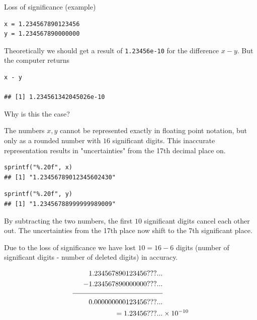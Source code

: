 \documentclass[11pt,compress,t,notes=noshow, xcolor=table]{beamer}
\begin{document}
\begin{vbframe}{Loss of significance (example)}

\footnotesize
\begin{verbatim}
x = 1.234567890123456
y = 1.234567890000000
\end{verbatim}


\normalsize
\lz
Theoretically we should get a result of \texttt{1.23456e-10} for the difference $x - y$. But the computer returns
\lz
\footnotesize
\begin{verbatim}
x - y

## [1] 1.234561342045026e-10
\end{verbatim}

\lz
\lz
\normalsize
Why is this the case?

\framebreak

The numbers $x, y$ cannot be represented exactly in floating point notation, but only as a rounded number with $16$ significant digits. This inaccurate representation results in "uncertainties" from the 17th decimal place on.

\lz
\lz
\footnotesize
\begin{verbatim}
sprintf("%.20f", x)
## [1] "1.23456789012345602430"
\end{verbatim}


\vspace{0.1cm}
\begin{verbatim}
sprintf("%.20f", y)
## [1] "1.23456788999999989009"
\end{verbatim}

\lz
\framebreak
\normalsize
By subtracting the two numbers, the first $10$ significant digits cancel each other out. The uncertainties from the 17th place now shift to the 7th significant place.

\lz

Due to the loss of significance we have lost $10 = 16 - 6$ digits (number of significant digits - number of deleted digits) in accuracy.
\vspace*{-0.5cm}

\begin{align*}
   1.234567890123456???... & \\
 - 1.234567890000000???... & \\[-1ex]
 \rule{4.5cm}{0.4pt} & \\
 0.000000000123456???... & \\
 = 1.23456???... & \times 10^{-10}
\end{align*}


\end{vbframe}


\endlecture
\end{document}
